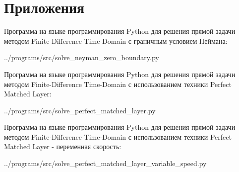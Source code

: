 \section*{Приложения}

Программа на языке программирования Python
для решения прямой задачи методом Finite-Difference Time-Domain
с граничным условием Неймана:

{../programs/src/solve_neyman_zero_boundary.py}

Программа на языке программирования Python
для решения прямой задачи методом Finite-Difference Time-Domain
с использованием техники Perfect Matched Layer:

{../programs/src/solve_perfect_matched_layer.py}

Программа на языке программирования Python
для решения прямой задачи методом Finite-Difference Time-Domain
с использованием техники Perfect Matched Layer - переменная скорость:

{../programs/src/solve_perfect_matched_layer_variable_speed.py}
